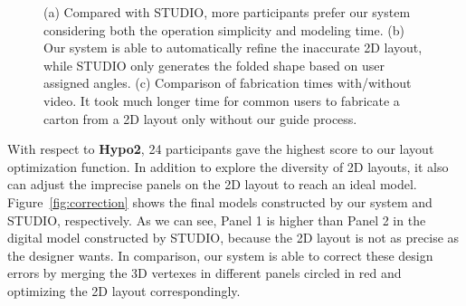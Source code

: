 \begin{figure}
	\centering
	\caption{(a) Compared with STUDIO, more participants prefer our system considering both the operation simplicity and modeling time. (b) Our system is able to automatically refine the inaccurate 2D layout, while STUDIO only generates the folded shape based on user assigned angles. (c) Comparison of fabrication times with/without video. It took much longer time for common users to fabricate a carton from a 2D layout only without our guide process.}
	\label{fig:userstudy}
\end{figure}

With respect to \textbf{Hypo2}, 24 participants gave the highest score to our layout optimization function. 
%
In addition to explore the diversity of 2D layouts, it also can adjust the imprecise panels on the 2D layout to reach an ideal model. Figure~\ref{fig:correction} shows the final models constructed by our system and STUDIO, respectively. As we can see, Panel 1 is higher than Panel 2 in the digital model constructed by STUDIO, because the 2D layout is not as precise as the designer wants. 
%
In comparison, our system is able to correct these design errors by merging the 3D vertexes in different panels circled in red and optimizing the 2D layout correspondingly.

